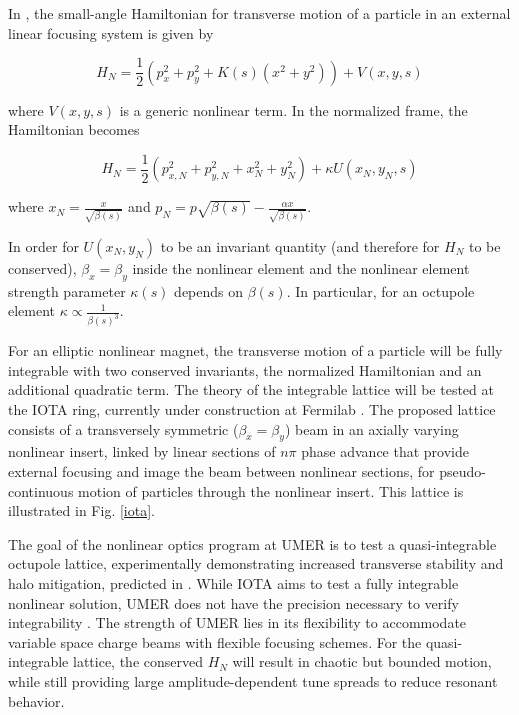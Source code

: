 In \cite{DN}, the small-angle Hamiltonian for transverse motion of a particle in an external linear focusing system is given by 

\begin{equation}
H_N = \frac{1}{2} \left( p_{x}^2 + p_{y}^2 + K(s) \left(x^2 + y^2 \right) \right) + V(x,y,s)
\end{equation}

where $V(x,y,s)$ is a generic nonlinear term. In the normalized frame, the Hamiltonian becomes 

\begin{equation}
H_N = \frac{1}{2} \left( p_{x,N}^2 + p_{y,N}^2 +x_N^2 + y_N^2 \right) + \kappa U(x_N,y_N,s)
\end{equation}

where $x_N = \frac{x}{\sqrt{\beta(s)}}$ and $p_N = p\sqrt{\beta(s)}-\frac{\alpha x}{\sqrt{\beta(s)}}$. 

In order for $U(x_N,y_N)$ to be an invariant quantity (and therefore for $H_N$ to be conserved), $\beta_x=\beta_y$ inside the nonlinear element and the nonlinear element strength parameter $\kappa (s)$ depends on $\beta (s)$. In particular, for an octupole element $\kappa \propto \frac{1}{\beta(s)^3}$.

For an elliptic nonlinear magnet, the transverse motion of a particle will be fully integrable with two conserved invariants, the normalized Hamiltonian and an additional quadratic term. The theory of the integrable lattice will be tested at the IOTA ring, currently under construction at Fermilab \cite{ipac12,antipov}. The proposed lattice consists of a transversely symmetric ($\beta_x = \beta_y$) beam in an axially varying nonlinear insert, linked by linear sections of $n\pi$ phase advance that provide external focusing and image the beam between nonlinear sections, for pseudo-continuous motion of particles through the nonlinear insert. This lattice is illustrated in Fig. \ref{iota}.

The goal of the nonlinear optics program at UMER is to test a quasi-integrable octupole lattice, experimentally demonstrating increased transverse stability and halo mitigation, predicted in \cite{Webb}. While IOTA aims to test a fully integrable nonlinear solution, UMER does not have the precision necessary to verify integrability \cite{ipac12}. The strength of UMER lies in its flexibility to accommodate variable space charge beams with flexible focusing schemes. For the quasi-integrable lattice, the conserved $H_N$ will result in chaotic but bounded motion, while still providing large amplitude-dependent tune spreads to reduce resonant behavior.


